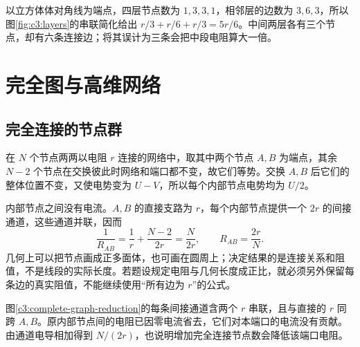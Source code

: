 以立方体体对角线为端点，四层节点数为 $1,3,3,1$，相邻层的边数为 $3,6,3$，所以图\ref{fig:c3:layers}的串联简化给出 $r/3+r/6+r/3=5r/6$。中间两层各有三个节点，却有六条连接边；将其误计为三条会把中段电阻算大一倍。


\section{完全图与高维网络}
\subsection{完全连接的节点群}

在 $N$ 个节点两两以电阻 $r$ 连接的网络中，取其中两个节点 $A,B$ 为端点，其余 $N-2$ 个节点在交换彼此时网络和端口都不变，故它们等势。交换 $A,B$ 后它们的整体位置不变，又使电势变为 $U-V$，所以每个内部节点电势均为 $U/2$。

内部节点之间没有电流。$A,B$ 的直接支路为 $r$，每个内部节点提供一个 $2r$ 的间接通道，这些通道并联，因而
\[
 \frac1{R_{AB}}=\frac1r+\frac{N-2}{2r}=\frac N{2r},\qquad
 R_{AB}=\frac{2r}{N}.
\]
几何上可以把节点画成正多面体，也可画在圆周上；决定结果的是连接关系和阻值，不是线段的实际长度。若题设规定电阻与几何长度成正比，就必须另外保留每条边的真实阻值，不能继续使用“所有边为 $r$”的公式。

图\ref{c3:complete-graph-reduction}的每条间接通道含两个 $r$ 串联，且与直接的 $r$ 同跨 $A,B$。原内部节点间的电阻已因零电流省去，它们对本端口的电流没有贡献。由通道电导相加得到 $N/(2r)$，也说明增加完全连接节点数会降低该端口电阻。

